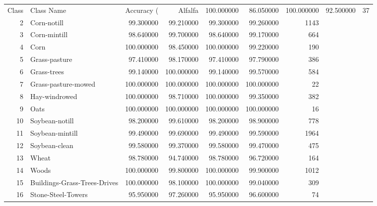 \begin{tabular}{rlrrrrr}
\toprule
Class & Class Name & Accuracy (%
 & Alfalfa & 100.000000 & 86.050000 & 100.000000 & 92.500000 & 37 \\
2 & Corn-notill & 99.300000 & 99.210000 & 99.300000 & 99.260000 & 1143 \\
3 & Corn-mintill & 98.640000 & 99.700000 & 98.640000 & 99.170000 & 664 \\
4 & Corn & 100.000000 & 98.450000 & 100.000000 & 99.220000 & 190 \\
5 & Grass-pasture & 97.410000 & 98.170000 & 97.410000 & 97.790000 & 386 \\
6 & Grass-trees & 99.140000 & 100.000000 & 99.140000 & 99.570000 & 584 \\
7 & Grass-pasture-mowed & 100.000000 & 100.000000 & 100.000000 & 100.000000 & 22 \\
8 & Hay-windrowed & 100.000000 & 98.710000 & 100.000000 & 99.350000 & 382 \\
9 & Oats & 100.000000 & 100.000000 & 100.000000 & 100.000000 & 16 \\
10 & Soybean-notill & 98.200000 & 99.610000 & 98.200000 & 98.900000 & 778 \\
11 & Soybean-mintill & 99.490000 & 99.690000 & 99.490000 & 99.590000 & 1964 \\
12 & Soybean-clean & 99.580000 & 99.370000 & 99.580000 & 99.470000 & 475 \\
13 & Wheat & 98.780000 & 94.740000 & 98.780000 & 96.720000 & 164 \\
14 & Woods & 100.000000 & 99.800000 & 100.000000 & 99.900000 & 1012 \\
15 & Buildings-Grass-Trees-Drives & 100.000000 & 98.100000 & 100.000000 & 99.040000 & 309 \\
16 & Stone-Steel-Towers & 95.950000 & 97.260000 & 95.950000 & 96.600000 & 74 \\
\bottomrule
\end{tabular}
